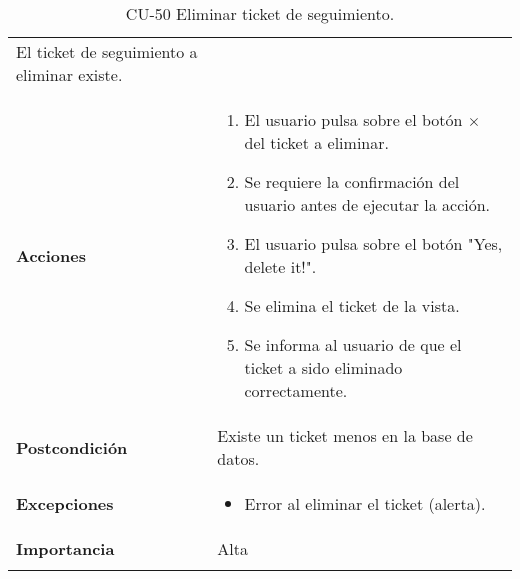 \begin{longtable}[]{@{}ll@{}}
\begin{minipage}[t]{0.70\columnwidth}
El ticket de seguimiento a eliminar existe.\strut
\end{minipage}\tabularnewline
\begin{minipage}[t]{0.24\columnwidth}\raggedright
\textbf{Acciones}\strut
\end{minipage} & \begin{minipage}[t]{0.70\columnwidth}\raggedright
\begin{enumerate}
\def\labelenumi{\arabic{enumi}.}
\tightlist
\item
  El usuario pulsa sobre el botón {$\times$} del ticket a eliminar.
\item
  Se requiere la confirmación del usuario antes de ejecutar la acción.
\item
  El usuario pulsa sobre el botón "Yes, delete it!".
\item
  Se elimina el ticket de la vista.
\item
  Se informa al usuario de que el ticket a sido eliminado correctamente.
\end{enumerate}\strut
\end{minipage}\tabularnewline
\begin{minipage}[t]{0.24\columnwidth}\raggedright
\textbf{Postcondición}\strut
\end{minipage} & \begin{minipage}[t]{0.70\columnwidth}\raggedright
Existe un ticket menos en la base de datos.\strut
\end{minipage}\tabularnewline
\begin{minipage}[t]{0.24\columnwidth}\raggedright
\textbf{Excepciones}\strut
\end{minipage} & \begin{minipage}[t]{0.70\columnwidth}\raggedright
\begin{itemize}
\tightlist
\item
  Error al eliminar el ticket (alerta).
\end{itemize}\strut
\end{minipage}\tabularnewline
\begin{minipage}[t]{0.24\columnwidth}\raggedright
\textbf{Importancia}\strut
\end{minipage} & \begin{minipage}[t]{0.70\columnwidth}\raggedright
Alta\strut
\end{minipage}\tabularnewline
\bottomrule
\caption{CU-50 Eliminar ticket de seguimiento.}
\end{longtable}

